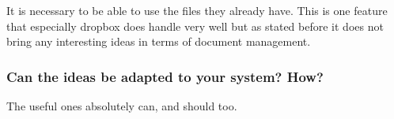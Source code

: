 It is necessary to be able to use the files they already have.
This is one feature that especially dropbox does handle very well but as stated before it does not bring any interesting ideas in terms of document management.

\subsubsection*{Can the ideas be adapted to your system? How?}

The useful ones absolutely can, and should too.


